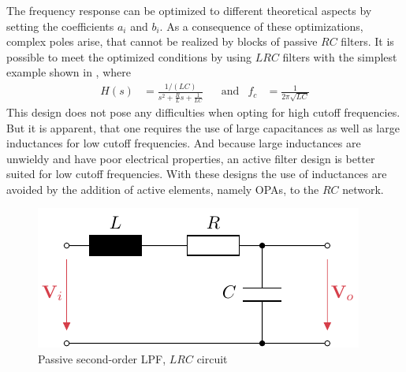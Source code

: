 The frequency response can be optimized to different theoretical aspects by setting the coefficients $a_i$ and $b_i$. As a consequence of these optimizations, complex poles arise, that cannot be realized by blocks of passive $RC$ filters. It is possible to meet the optimized conditions by using $LRC$ filters with the simplest example shown in , where
\begin{align}
  &&H(s) &= \frac{1/(LC)}{s^2+\frac{R}{L}s+\frac{1}{LC}} &&\text{and} &f_c &= \frac{1}{2\pi\sqrt{LC}}&&
\end{align}
This design does not pose any difficulties when opting for high cutoff frequencies. But it is apparent, that one requires the use of large capacitances as well as large inductances for low cutoff frequencies. And because large inductances are unwieldy and have poor electrical properties, an active filter design is better suited for low cutoff frequencies. With these designs the use of inductances are avoided by the addition of active elements, namely \ac{OPA}s, to the $RC$ network.

\begin{figure}[htb!]
  \centering
  \includegraphics[scale=1]{figures/electronics/lowpass/lp_passive_2ord/lp_passive_2ord}
  \caption[Passive second-order \ac{LPF}]{Passive second-order \ac{LPF}, $LRC$ circuit%
    \label{fig:lp_passive_2ord}}
\end{figure}

\newpage
